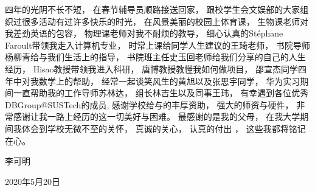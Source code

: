 \begin{thanks}
四年的光阴不长不短， 
在春节辅导员顺路接送回家，
跟校学生会文娱部的大家组织过很多活动有过许多快乐的时光，
在风景美丽的校园上体育课，
生物课老师对我差劲英语的包容， 
物理课老师对我不耐烦的教导，
细心认真的Stéphane Faroult带领我走入计算机专业，
时常上课给同学人生建议的王琦老师，
书院导师杨柳青给与我们生活上的指导， 
书院班主任史玉回老师给我们分享的自己的人生经历，
Hisao教授带领我进入科研， 
唐博教授教懂我如何做项目， 
邵宣杰同学四年中对我数学上的帮助，
经常一起谈笑风生的黄旭以及张思宇同学， 
华为实习期间一直帮助我的工作导师苏林达， 组长林吉生以及同事王玮，
有幸遇到各位优秀DBGroup@SUSTech的成员,
感谢学校给与的丰厚资助，
强大的师资与硬件，
非常感谢让我一路上经历的这一切美好与困难。
最感谢的是我的父母， 在我大学期间我体会到学校无微不至的关怀， 真诚的关心， 认真的付出 ， 
这些我都将铭记在心。
\vskip 18pt

\begin{flushright}

李可明

2020年5月20日

\end{flushright}

\end{thanks}
